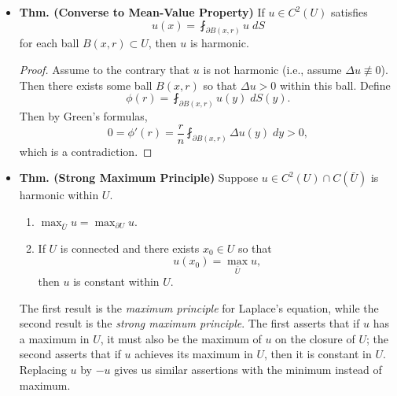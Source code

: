 \documentclass{article}
\begin{document}
\begin{itemize}
		\item \textbf{Thm. (Converse to Mean-Value Property)} If $u \in C^{2}(U)$ satisfies 
		\begin{equation*}
			u(x) = \fint_{\partial B(x, r)}u\;dS 
		\end{equation*}
		for each ball $B(x, r) \subset U$, then $u$ is harmonic. 
		
		\begin{proof}
			Assume to the contrary that $u$ is not harmonic (i.e., assume $\Delta u \not \equiv 0$). Then there exists some ball $B(x, r)$ so that $\Delta u > 0$ within this ball. Define 
			\begin{equation*}
				\phi(r) = \fint_{\partial B(x, r)}u(y)\;dS(y). 
			\end{equation*}
			Then by Green's formulas, 
			\begin{equation*}
				0 = \phi'(r) = \frac{r}{n}\fint_{\partial B(x, r)}\Delta u(y)\;dy > 0,
			\end{equation*}
			which is a contradiction. 
		\end{proof}
		
		\item \textbf{Thm. (Strong Maximum Principle)} Suppose $u \in C^{2}(U) \cap C(\bar{U})$ is harmonic within $U$. \vspace{-0.25cm}
		\begin{enumerate}[itemsep = -2pt,label = (\roman{*})]
			\item $\max_{\bar{U}}u = \max_{\partial U}u$. 
			\item If $U$ is connected and there exists $x_{0} \in U$ so that 
			\begin{equation*}
				u(x_{0}) = \max_{\bar{U}}u, 
			\end{equation*}
			then $u$ is constant within $U$. 
		\end{enumerate}
		The first result is the \textit{maximum principle} for Laplace's equation, while the second result is the \textit{strong maximum principle}. The first asserts that if $u$ has a maximum in $U$, it must also be the maximum of $u$ on the closure of $U$; the second asserts that if $u$ achieves its maximum in $U$, then it is constant in $U$. Replacing $u$ by $-u$ gives us similar assertions with the minimum instead of maximum. 
		

\end{itemize}
\end{document}
